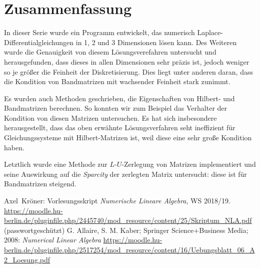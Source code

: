 \documentclass[smallheadings]{scrartcl}
\numberwithin{equation}{section}
\begin{document}
\section{Zusammenfassung}

In dieser Serie wurde ein Programm entwickelt, das numerisch Laplace-Differentialgleichungen in 1, 2 und 3 Dimensionen lösen kann. Des Weiteren wurde die Genauigkeit von diesem Lösungsverefahren untersucht und herausgefunden, dass dieses in allen Dimensionen sehr präzis ist, jedoch weniger so je größer die Feinheit der Diskretisierung. Dies liegt unter anderen daran, dass die Kondition von Bandmatrizen mit wachsender Feinheit stark zunimmt.

Es wurden auch Methoden geschrieben, die Eigenschaften von Hilbert- und Bandmatrizen berechnen. So konnten wir zum Beispiel das Verhalter der Kondition von diesen Matrizen untersuchen. Es hat sich insbesondere herausgestellt, dass das oben erwähnte Lösungsverfahren seht ineffizient für Gleichungssysteme mit Hilbert-Matrizen ist, weil diese eine sehr große Kondition haben.

Letztlich wurde eine Methode zur $L$-$U$-Zerlegung von Matrizen implementiert und seine Auswirkung auf die \textit{Sparcity} der zerlegten Matrix untersucht: diese ist für Bandmatrizen steigend.


\begin{thebibliography}{9}
 Axel~Kröner: Vorlesungsskript \textit{Numerische Lineare Algebra}, WS 2018/19. 
\url{https://moodle.hu-berlin.de/pluginfile.php/2445740/mod_resource/content/25/Skriptum_NLA.pdf} (passwortgeschützt)
 G. Allaire, S. M. Kaber; Springer Science+Business Media; 2008: \textit{Numerical Linear Algebra}
\url{https://moodle.hu-berlin.de/pluginfile.php/2517254/mod_resource/content/16/Uebungsblatt_06_A2_Loesung.pdf}
\end{thebibliography}


\end{document}
